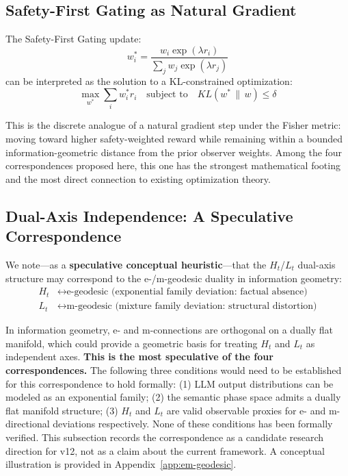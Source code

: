 \documentclass[11pt,a4paper]{article}
\begin{document}
\subsection{Safety-First Gating as Natural Gradient}

The Safety-First Gating update:
\begin{equation}
w_i^* = \frac{w_i \exp(\lambda r_i)}{\sum_j w_j \exp(\lambda r_j)}
\end{equation}
can be interpreted as the solution to a KL-constrained optimization:
\begin{equation}
\max_{w^*} \sum_i w_i^* r_i
\quad \text{subject to} \quad KL(w^* \,\|\, w) \leq \delta
\end{equation}

This is the discrete analogue of a natural gradient step under the Fisher metric:
moving toward higher safety-weighted reward while remaining within a bounded
information-geometric distance from the prior observer weights.
Among the four correspondences proposed here, this one has the strongest
mathematical footing and the most direct connection to existing optimization theory.

\subsection{Dual-Axis Independence: A Speculative Correspondence}
\label{sec:em-geodesic}

We note---as a \textbf{speculative conceptual heuristic}---that the $H_t$/$L_t$ dual-axis
structure may correspond to the e-/m-geodesic duality in information geometry:
\begin{align}
H_t &\leftrightarrow \text{e-geodesic (exponential family deviation: factual absence)} \\
L_t &\leftrightarrow \text{m-geodesic (mixture family deviation: structural distortion)}
\end{align}

In information geometry, e- and m-connections are orthogonal on a dually flat manifold,
which could provide a geometric basis for treating $H_t$ and $L_t$ as independent axes.
\textbf{This is the most speculative of the four correspondences.}
The following three conditions would need to be established for this correspondence
to hold formally: (1) LLM output distributions can be modeled as an exponential family;
(2) the semantic phase space admits a dually flat manifold structure;
(3) $H_t$ and $L_t$ are valid observable proxies for e- and m-directional deviations
respectively. None of these conditions has been formally verified.
This subsection records the correspondence as a candidate research direction for v12,
not as a claim about the current framework.
A conceptual illustration is provided in Appendix~\ref{app:em-geodesic}.
\end{document}
